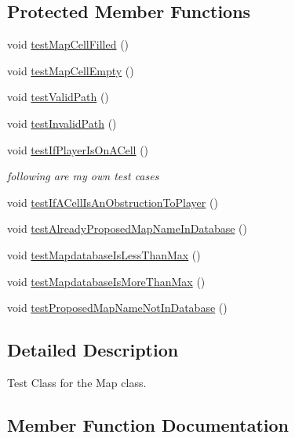 \subsection*{Protected Member Functions}
\begin{DoxyCompactItemize}
\item 
void \hyperlink{class_map_test_a07e1aa96435351d15809b880ff7a7efb}{test\+Map\+Cell\+Filled} ()
\item 
void \hyperlink{class_map_test_a83bb3473f74089996c7f6bee8d59a97c}{test\+Map\+Cell\+Empty} ()
\item 
void \hyperlink{class_map_test_ae7a28d196c97101aa248a326af2a3f5b}{test\+Valid\+Path} ()
\item 
void \hyperlink{class_map_test_ad8823027d386c8d25f378d02adad120d}{test\+Invalid\+Path} ()
\item 
void \hyperlink{class_map_test_ac82274fe5fff0c9eea7425f49a55bfb5}{test\+If\+Player\+Is\+On\+A\+Cell} ()
\begin{DoxyCompactList}\small\item\em following are my own test cases \end{DoxyCompactList}\item 
void \hyperlink{class_map_test_ad1ed8e9db8609f3e45f8a6a0a17b4ec0}{test\+If\+A\+Cell\+Is\+An\+Obstruction\+To\+Player} ()
\item 
void \hyperlink{class_map_test_a4676b2ea500115cb5c711d54decc1c62}{test\+Already\+Proposed\+Map\+Name\+In\+Database} ()
\item 
void \hyperlink{class_map_test_afebfa18bc151eb842156e7b3db24f567}{test\+Mapdatabase\+Is\+Less\+Than\+Max} ()
\item 
void \hyperlink{class_map_test_a35bb26a632d1d4926ef62a6871e5f3c9}{test\+Mapdatabase\+Is\+More\+Than\+Max} ()
\item 
void \hyperlink{class_map_test_adb1babd418a102b71ebd712fbff3a3d3}{test\+Proposed\+Map\+Name\+Not\+In\+Database} ()
\end{DoxyCompactItemize}


\subsection{Detailed Description}
Test Class for the Map class. 

\subsection{Member Function Documentation}
\hypertarget{class_map_test_a4676b2ea500115cb5c711d54decc1c62}{}\label{class_map_test_a4676b2ea500115cb5c711d54decc1c62} 
